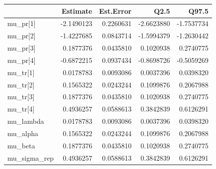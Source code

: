 
\begin{tabular}{lrrrr}
\toprule
  & Estimate & Est.Error & Q2.5 & Q97.5\\
\midrule
mu\_pr[1] & -2.1490123 & 0.2260631 & -2.6623880 & -1.7537734\\
mu\_pr[2] & -1.4227685 & 0.0843714 & -1.5994379 & -1.2630442\\
mu\_pr[3] & 0.1877376 & 0.0435810 & 0.1020938 & 0.2740775\\
mu\_pr[4] & -0.6872215 & 0.0937434 & -0.8698726 & -0.5059269\\
mu\_tr[1] & 0.0178783 & 0.0093086 & 0.0037396 & 0.0398320\\
\addlinespace
mu\_tr[2] & 0.1565322 & 0.0243244 & 0.1099876 & 0.2067988\\
mu\_tr[3] & 0.1877376 & 0.0435810 & 0.1020938 & 0.2740775\\
mu\_tr[4] & 0.4936257 & 0.0588613 & 0.3842839 & 0.6126291\\
mu\_lambda & 0.0178783 & 0.0093086 & 0.0037396 & 0.0398320\\
mu\_alpha & 0.1565322 & 0.0243244 & 0.1099876 & 0.2067988\\
\addlinespace
mu\_beta & 0.1877376 & 0.0435810 & 0.1020938 & 0.2740775\\
mu\_sigma\_rep & 0.4936257 & 0.0588613 & 0.3842839 & 0.6126291\\
\bottomrule
\end{tabular}
